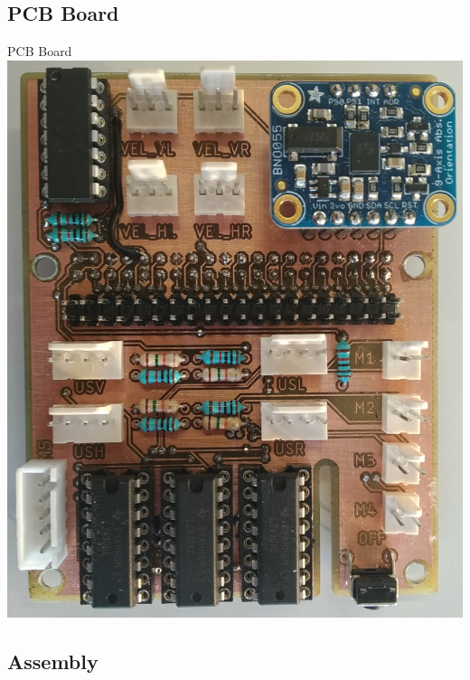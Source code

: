 \documentclass{beamer}
\begin{document}
\subsection{PCB Board}

\begin{frame}{PCB Board}
\centering
\includegraphics[scale=0.098, angle=90]{sources/pcb.jpg}
\end{frame}

\subsection{Assembly}
\end{document}
